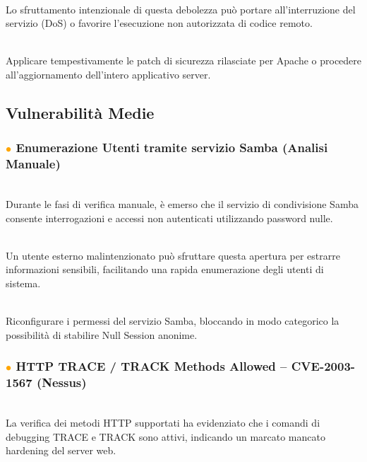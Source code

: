 \documentclass[12pt, a4paper]{article}
\begin{document}
	\vspace{0.2 cm}
	 \\\vspace{0.2 cm}
	Lo sfruttamento intenzionale di questa debolezza può portare all'interruzione del servizio (DoS) o favorire l'esecuzione non autorizzata di codice remoto.

	\vspace{0.2 cm}
	 \\\vspace{0.2 cm}
	Applicare tempestivamente le patch di sicurezza rilasciate per Apache o procedere all'aggiornamento dell'intero applicativo server.

	\subsection{Vulnerabilità Medie}

	\subsubsection{\textcolor{orange}{$\bullet$} Enumerazione Utenti tramite servizio Samba (Analisi Manuale)}
	\\	 \vspace{0.2 cm}	
	Durante le fasi di verifica manuale, è emerso che il servizio di condivisione Samba consente interrogazioni e accessi non autenticati utilizzando password nulle.

	\vspace{0.2 cm}
	\\ \vspace{0.2 cm}
	 Un utente esterno malintenzionato può sfruttare questa apertura per estrarre informazioni sensibili, facilitando una rapida enumerazione degli utenti di sistema.

	\vspace{0.2 cm}
	 \\ \vspace{0.2 cm}
	Riconfigurare i permessi del servizio Samba, bloccando in modo categorico la possibilità di stabilire Null Session anonime.


	\subsubsection{\textcolor{orange}{$\bullet$} HTTP TRACE / TRACK Methods Allowed -- CVE-2003-1567 (Nessus)}
	 \\ \vspace{0.2 cm}
	La verifica dei metodi HTTP supportati ha evidenziato che i comandi di debugging TRACE e TRACK sono attivi, indicando un marcato mancato hardening del server web.
\end{document}
